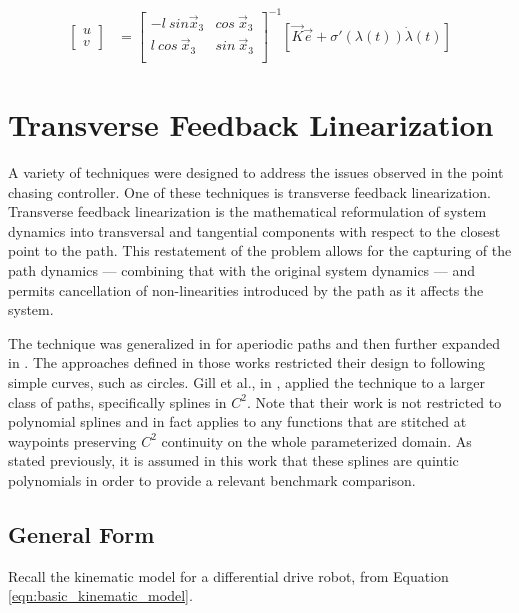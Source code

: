 \documentclass[oneside, 11pt]{book}
\begin{document}
\begin{align*}
    \begin{bmatrix}
        u \\ v
    \end{bmatrix}   &=  \begin{bmatrix}
                            -l~sin\vec{x}_3 & cos~\vec{x}_3 \\
                            l~cos~\vec{x}_3 & sin~\vec{x}_3 \\
                        \end{bmatrix}^{-1}
                        \left[
                            \vec{K}\vec{e} + \sigma'(\lambda(t))\dot{\lambda}(t)
                        \right]
\end{align*}

\section{Transverse Feedback Linearization}
A variety of techniques were designed to address the issues observed in the point chasing controller. One of these techniques is transverse feedback linearization. Transverse feedback linearization is the mathematical reformulation of system dynamics into transversal and tangential components with respect to the closest point to the path. This restatement of the problem allows for the capturing of the path dynamics --- combining that with the original system dynamics --- and permits cancellation of non-linearities introduced by the path as it affects the system.

The technique was generalized in \cite{Nielsen06} for aperiodic paths and then further expanded in \cite{Hladio13}. The approaches defined in those works restricted their design to following simple curves, such as circles. Gill et al., in \cite{Gill15}, applied the technique to a larger class of paths, specifically splines in $C^2$. Note that their work is not restricted to polynomial splines and in fact applies to any functions that are stitched at waypoints preserving $C^2$ continuity on the whole parameterized domain. As stated previously, it is assumed in this work that these splines are quintic polynomials in order to provide a relevant benchmark comparison.

\subsection{General Form}\label{sec:general_tfl}
Recall the kinematic model for a differential drive robot, from Equation \ref{eqn:basic_kinematic_model}.
\end{document}
